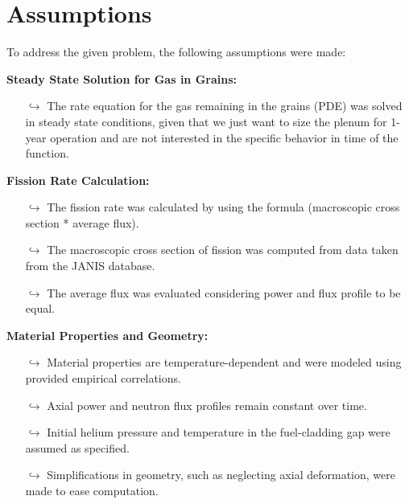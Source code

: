
\section{Assumptions}
To address the given problem, the following assumptions were made:

\textbf{Steady State Solution for Gas in Grains:}

\begin{itemize}
\item[$\hookrightarrow$] The rate equation for the gas remaining in the grains (PDE) was solved in steady state conditions, given that we just want to size the plenum for 1-year operation and are not interested in the specific behavior in time of the function.
\end{itemize}

\textbf{Fission Rate Calculation:}

\begin{itemize}
\item[$\hookrightarrow$] The fission rate was calculated by using the formula (macroscopic cross section * average flux).
\item[$\hookrightarrow$] The macroscopic cross section of fission was computed from data taken from the JANIS database.
\item[$\hookrightarrow$] The average flux was evaluated considering power and flux profile to be equal.
\end{itemize}

\textbf{Material Properties and Geometry:}

\begin{itemize}
\item[$\hookrightarrow$] Material properties are temperature-dependent and were modeled using provided empirical correlations.
\item[$\hookrightarrow$] Axial power and neutron flux profiles remain constant over time.
\item[$\hookrightarrow$] Initial helium pressure and temperature in the fuel-cladding gap were assumed as specified.
\item[$\hookrightarrow$] Simplifications in geometry, such as neglecting axial deformation, were made to ease computation.
\end{itemize}
